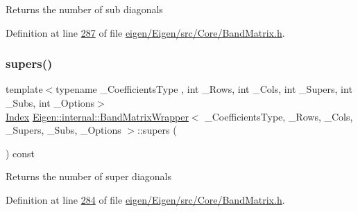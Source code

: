 \begin{DoxyReturn}{Returns}
the number of sub diagonals 
\end{DoxyReturn}


Definition at line \hyperlink{eigen_2_eigen_2src_2_core_2_band_matrix_8h_source_l00287}{287} of file \hyperlink{eigen_2_eigen_2src_2_core_2_band_matrix_8h_source}{eigen/\+Eigen/src/\+Core/\+Band\+Matrix.\+h}.

\mbox{\label{class_eigen_1_1internal_1_1_band_matrix_wrapper_a5e874cc43bb0b406241e3cc6042335e5}} 
\subsubsection{\texorpdfstring{supers()}{supers()}\hspace{0.1cm}{\footnotesize\ttfamily [1/2]}}
{\footnotesize\ttfamily template$<$typename \+\_\+\+Coefficients\+Type , int \+\_\+\+Rows, int \+\_\+\+Cols, int \+\_\+\+Supers, int \+\_\+\+Subs, int \+\_\+\+Options$>$ \\
\hyperlink{group___core___module_a554f30542cc2316add4b1ea0a492ff02}{Index} \hyperlink{class_eigen_1_1internal_1_1_band_matrix_wrapper}{Eigen\+::internal\+::\+Band\+Matrix\+Wrapper}$<$ \+\_\+\+Coefficients\+Type, \+\_\+\+Rows, \+\_\+\+Cols, \+\_\+\+Supers, \+\_\+\+Subs, \+\_\+\+Options $>$\+::supers (\begin{DoxyParamCaption}{ }\end{DoxyParamCaption}) const\hspace{0.3cm}{\ttfamily [inline]}}

\begin{DoxyReturn}{Returns}
the number of super diagonals 
\end{DoxyReturn}


Definition at line \hyperlink{eigen_2_eigen_2src_2_core_2_band_matrix_8h_source_l00284}{284} of file \hyperlink{eigen_2_eigen_2src_2_core_2_band_matrix_8h_source}{eigen/\+Eigen/src/\+Core/\+Band\+Matrix.\+h}.

\mbox{\label{class_eigen_1_1internal_1_1_band_matrix_wrapper_a5e874cc43bb0b406241e3cc6042335e5}} 
